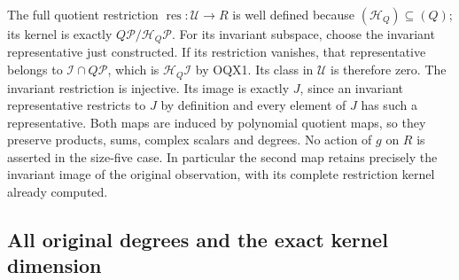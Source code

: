 \documentclass[11pt,a4paper]{article}
\begin{document}
The full quotient restriction
$\operatorname{res}:\mathscr U\to R$ is well defined because
$(\mathcal H_Q)\subseteq(Q)$; its kernel is exactly
$Q\mathscr P/\mathcal H_Q\mathscr P$.
For its invariant subspace, choose the invariant representative
just constructed. If its restriction vanishes, that representative
belongs to $\mathscr I\cap Q\mathscr P$, which is
$\mathcal H_Q\mathscr I$ by OQX1. Its class in $\mathscr U$ is
therefore zero. The invariant restriction is injective. Its image
is exactly $J$, since an invariant representative restricts to
$J$ by definition and every element of $J$ has such a representative.
Both maps are induced by polynomial quotient maps, so they preserve
products, sums, complex scalars and degrees. No action of $g$ on
$R$ is asserted in the size-five case. In particular the second
map retains precisely the invariant image of the original
observation, with its complete restriction kernel already computed.

\subsection{All original degrees and the exact kernel dimension}
\end{document}
